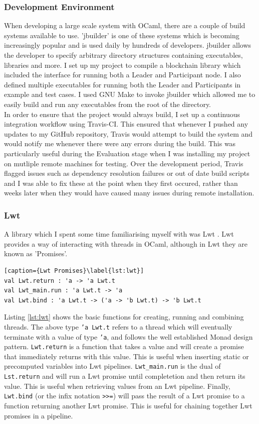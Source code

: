 \documentclass[12pt,a4paper,twoside,openright]{report}
\begin{document}
		\subsubsection*{Development Environment}
		When developing a large scale system with OCaml, there are a couple of build systems available to use. 
		'jbuilder' \cite{jbuilder} is one of these systems which is becoming increasingly popular and is used daily by hundreds of developers.
		jbuilder allows the developer to specify arbitrary directory structures containing executables, libraries and more.
		I set up my project to compile a blockchain library which included the interface for running both a Leader and Participant node. 
		I also defined multiple executables for running both the Leader and Participants in example and test cases. 
		I used GNU Make \cite{GNUMake} to invoke jbuilder which allowed me to easily build and run any executables from the root of the directory.\\
		
		In order to ensure that the project would always build, I set up a continuous integration workflow using Travis-CI. 
		This ensured that whenever I pushed any updates to my GitHub repository, Travis would attempt to build the system and would notify me whenever there were any errors during the build.
		This was particularly useful during the Evaluation stage when I was installing my project on mutliple remote machines for testing.
		Over the development period, Travis flagged issues such as dependency resolution failures or out of date build scripts and I was able to fix these at the point when they first occured, rather than weeks later when they would have caused many issues during remote installation.

	\subsubsection*{Lwt}
		A library which I spent some time familiarising myself with was Lwt \cite{Lwt}. 
		Lwt provides a way of interacting with threads in OCaml, although in Lwt they are known as 'Promises'.
		\begin{lstlisting}[caption={Lwt Promises}\label{lst:lwt}]
val Lwt.return : 'a -> 'a Lwt.t 
val Lwt_main.run : 'a Lwt.t -> 'a
val Lwt.bind : 'a Lwt.t -> ('a -> 'b Lwt.t) -> 'b Lwt.t
		\end{lstlisting}
		Listing \ref{lst:lwt} shows the basic functions for creating, running and combining threads.
		The above type \texttt{'a Lwt.t} refers to a thread which will eventually terminate with a value of type \texttt{'a}, and follows the well established Monad design pattern.
		\texttt{Lwt.return} is a function that takes a value and will create a promise that immediately returns with this value.
		This is useful when inserting static or precomputed variables into Lwt pipelines.
		\texttt{Lwt\_main.run} is the dual of \texttt{Lst.return} and will run a Lwt promise until completetion and then return its value.
		This is useful when retrieving values from an Lwt pipeline.
		Finally, \texttt{Lwt.bind} (or the infix notation \texttt{>>=}) will pass the result of a Lwt promise to a function returning another Lwt promise.
		This is useful for chaining together Lwt promises in a pipeline.
\end{document}
